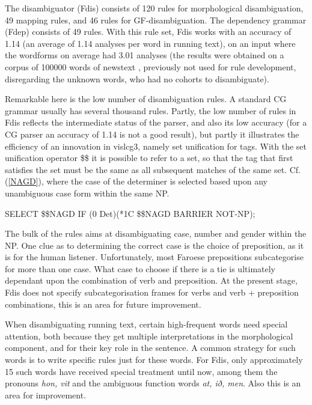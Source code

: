 \documentclass[a4paper,english]{article}
\begin{document}
The disambiguator (Fdis) consists of 120 rules for morphological disambiguation, 49 mapping rules, and 46 rules for GF-disambiguation. The dependency grammar (Fdep) consists of 49 rules. With this rule set, Fdis works with an accuracy of 1.14 (an average of 1.14 analyses per word in running text), on an input where the wordforms on average had 3.01 analyses (the results were obtained on a corpus of 100000 words of newstext , previously not used for rule development, disregarding the unknown words, who had no cohorts to disambiguate).

Remarkable here is the low number of disambiguation rules. A standard CG grammar usually has several thousand rules. Partly, the low number of rules in Fdis reflects the intermediate status of the parser, and also its low accuracy (for a CG parser an accuracy of 1.14 is not a good result), but partly it illustrates the efficiency of an innovation in vislcg3, namely set unification for tags. With the set unification operator \$\$ it is possible to refer to a set, so that the tag that first satisfies the set must be the same as all subsequent matches of the same set. Cf. (\ref{NAGD}), where the case of the determiner is selected based upon any unambiguous case form within the same NP.

\begin{example}\label{NAGD}
SELECT \$\$NAGD IF (0 Det)(*1C \$\$NAGD BARRIER NOT-NP);
\end{example}

The bulk of the rules aims at disambiguating case, number and gender within the NP. One clue as to determining the correct case is the choice of preposition, as it is for the human listener. Unfortunately, most Faroese prepositions subcategorise for more than one case. What case to choose if there is a tie is ultimately dependant upon the combination of verb and preposition. At the present stage, Fdis does not specify subcategorisation frames for verbs and verb + preposition combinations, this is an area for future improvement.

When disambiguating running text, certain high-frequent words need special attention, both because they get multiple interpretations in the morphological component, and for their key role in the sentence. A common strategy for such words is to write specific rules just for these words. For Fdis, only approximately 15 such words have received special treatment until now, among them the pronouns \textit{hon, vit} and the ambiguous function words \textit{at, ið, men}. Also this is an area for improvement.
\end{document}
